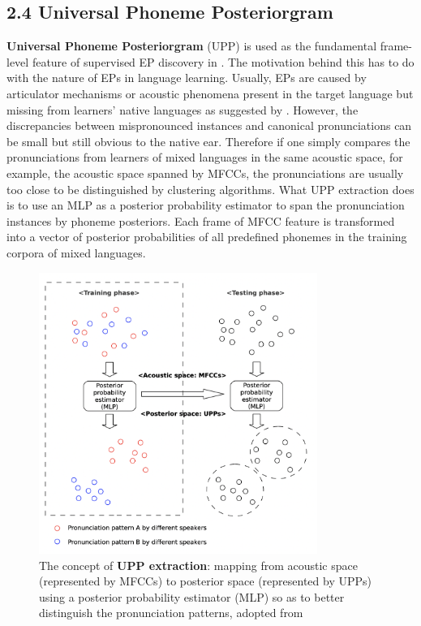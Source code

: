 \documentclass[nobib]{tufte-handout}
\begin{document}
\subsection{2.4 \textbf{Universal Phoneme Posteriorgram}}
\noindent \textbf{Universal Phoneme Posteriorgram} (UPP) is used as the fundamental frame-level feature of supervised EP discovery in \cite{wang2015supervised}. The motivation behind this has to do with the nature of EPs in language learning. Usually, EPs are caused by articulator mechanisms or acoustic phenomena present in the target language but missing from learners' native languages as suggested by \cite{wang2015supervised}. However, the discrepancies between mispronounced instances and canonical pronunciations can be small but still obvious to the native ear. Therefore if one simply compares the pronunciations from learners of mixed languages in the same acoustic space, for example, the acoustic space spanned by MFCCs, the pronunciations are usually too close to be distinguished by clustering algorithms. What UPP extraction does is to use an MLP as a posterior probability estimator to span the pronunciation instances by phoneme posteriors. Each frame of MFCC feature is transformed into a vector of posterior probabilities of all predefined phonemes in the training corpora of mixed languages.
\begin{figure}[h!]
\centering
  \includegraphics[width=0.81\textwidth]{upp.png}
  \caption{The concept of \textbf{UPP extraction}: mapping from acoustic space (represented by MFCCs) to posterior space (represented by UPPs) using a posterior probability estimator (MLP) so as to better distinguish the pronunciation patterns, adopted from \cite{wang2015supervised}}
  \label{fig:upp}
\end{figure}
\end{document}
